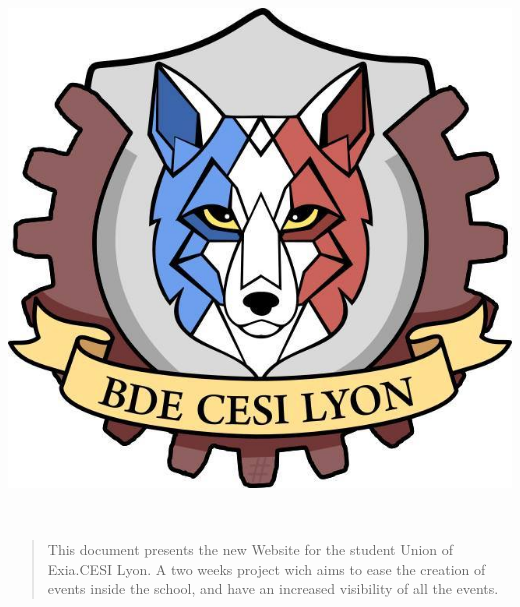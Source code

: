\documentclass[letterpaper]{article}
\begin{document}
\begin{titlepage}
\begin{minipage}{0.8\linewidth}
\begin{center}
				\vspace{1cm}
				\hspace{1cm}
				\includegraphics[scale=0.2]{img/logoBDE.jpg}
			\end{center}
			
	\end{minipage} \hspace{-10pt}
	\\
	\vfill
	
	\noindent\hspace{0.25\linewidth}\begin{minipage}{0.7\linewidth}
		\begin{abstract}
				This document presents the new Website for the student Union of Exia.CESI Lyon. A two weeks project wich aims to ease the creation of events inside the school, and have an increased visibility of all the events.

		\end{abstract}
	\end{minipage}
		

\end{titlepage}
\restoregeometry
\end{document}
